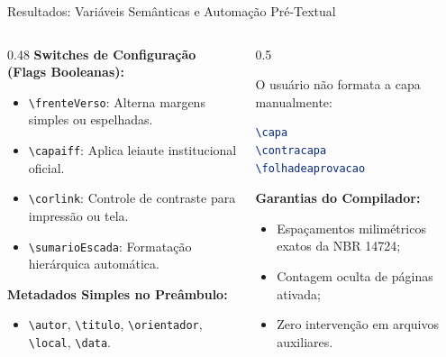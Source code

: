 \documentclass[aspectratio=169, 10pt]{beamer}
\begin{document}
\begin{frame}[fragile]{Resultados: Variáveis Semânticas e Automação Pré-Textual}
  \begin{columns}[T]
    \begin{column}{0.48\textwidth}
      \textbf{Switches de Configuração (Flags Booleanas):}
      \begin{itemize}
        \item \verb|\frenteVerso|: Alterna margens simples ou espelhadas.
        \item \verb|\capaiff|: Aplica leiaute institucional oficial.
        \item \verb|\corlink|: Controle de contraste para impressão ou tela.
        \item \verb|\sumarioEscada|: Formatação hierárquica automática.
      \end{itemize}
      \vspace{0.2cm}
      \textbf{Metadados Simples no Preâmbulo:}
      \begin{itemize}
        \item \verb|\autor|, \verb|\titulo|, \verb|\orientador|, \verb|\local|, \verb|\data|.
      \end{itemize}
    \end{column}

    \begin{column}{0.5\textwidth}
      \begin{tcolorbox}[colback=codebg,colframe=iffdark,title=\textbf{Geração com Comandos Únicos}]
        \small
        O usuário não formata a capa manualmente:
        \begin{lstlisting}[language=TeX]
\capa
\contracapa
\folhadeaprovacao
        \end{lstlisting}
        \vspace{0.2cm}
        \textbf{Garantias do Compilador:}
        \begin{itemize}
          \item Espaçamentos milimétricos exatos da NBR 14724;
          \item Contagem oculta de páginas ativada;
          \item Zero intervenção em arquivos auxiliares.
        \end{itemize}
      \end{tcolorbox}
    \end{column}
  \end{columns}
\end{frame}
\end{document}
